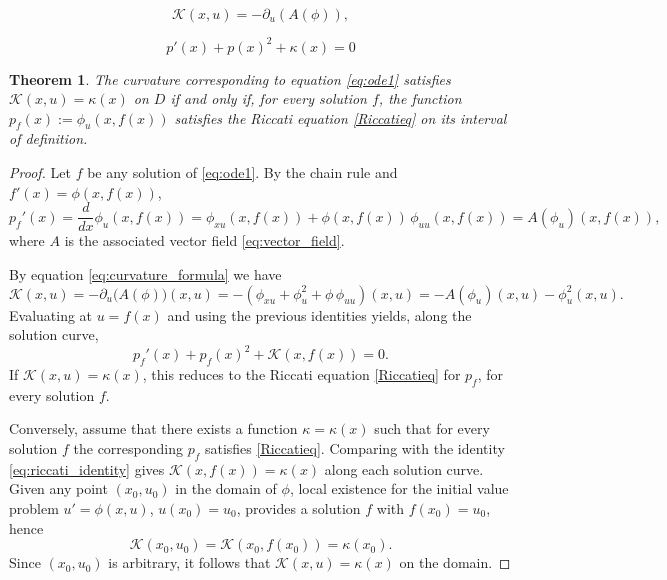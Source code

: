 \documentclass[10pt,a4paper]{amsart}
\newtheorem{theorem}{Theorem}
\begin{document}
\begin{equation} \label{eq:curvature_formula}
    \mathcal{K}(x,u) = -\partial_u(A(\phi)),
\end{equation}

\begin{equation}\label{Riccatieq}
p'(x) + p(x)^2 + \kappa(x) = 0
\end{equation}

\begin{theorem}\label{thm:riccati_connection}
The curvature corresponding to equation \eqref{eq:ode1} satisfies $\mathcal{K}(x,u)=\kappa(x)$ on $D$ if and only if, for every solution $f$, the function $p_f(x):=\phi_u(x,f(x))$ satisfies the Riccati equation \eqref{Riccatieq} on its interval of definition.
\end{theorem}

\begin{proof}%
Let $f$ be any solution of \eqref{eq:ode1}. By the chain rule and $f'(x)=\phi(x,f(x))$,
\[
p_f'(x)=\frac{d}{dx}\phi_u(x,f(x))=\phi_{xu}(x,f(x))+\phi(x,f(x))\,\phi_{uu}(x,f(x))=A(\phi_u)(x,f(x)),
\]
where $A$ is the associated vector field \eqref{eq:vector_field}.


By equation \eqref{eq:curvature_formula} we have
\[
\mathcal{K}(x,u)=-\partial_u\bigl(A(\phi)\bigr)(x,u)=-(\phi_{xu}+\phi_u^{2}+\phi\,\phi_{uu})(x,u)=-A(\phi_u)(x,u)-\phi_u^2(x,u). %
\]
Evaluating at $u=f(x)$ and using the previous identities yields, along the solution curve,
\begin{equation}\label{eq:riccati_identity}
p_f'(x)+p_f(x)^2+\mathcal{K}(x,f(x))=0.
\end{equation}
If $\mathcal{K}(x,u)=\kappa(x)$, this reduces to the Riccati equation \eqref{Riccatieq} for $p_f$, for every solution $f$.

Conversely, assume that there exists a function $\kappa=\kappa(x)$ such that for every solution $f$ the corresponding $p_f$ satisfies \eqref{Riccatieq}. Comparing with the identity \eqref{eq:riccati_identity} gives $\mathcal{K}(x,f(x))=\kappa(x)$ along each solution curve. Given any point $(x_0,u_0)$ in the domain of $\phi$, local existence for the initial value problem $u'=\phi(x,u)$, $u(x_0)=u_0$, provides a solution $f$ with $f(x_0)=u_0$, hence
\[
\mathcal{K}(x_0,u_0)=\mathcal{K}(x_0,f(x_0))=\kappa(x_0).
\]
Since $(x_0,u_0)$ is arbitrary, it follows that $\mathcal{K}(x,u)=\kappa(x)$ on the domain.
\end{proof}
\end{document}
